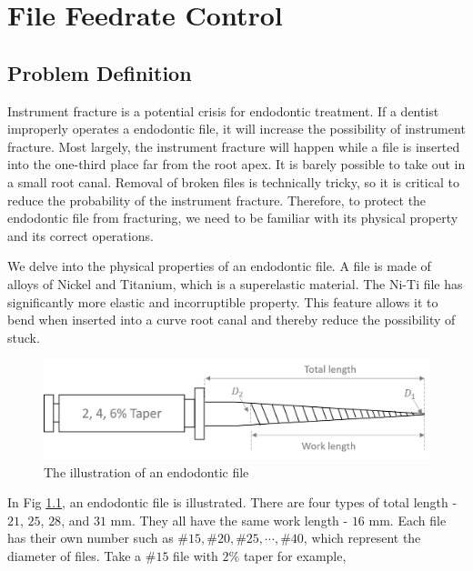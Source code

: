\chapter{File Feedrate Control}
\section{Problem Definition}
\hspace*{6mm}Instrument fracture is a potential crisis for endodontic treatment. If a dentist improperly operates a endodontic file, it will increase the possibility of instrument fracture. Most largely, the instrument fracture will happen while a file is inserted into the one-third place far from the root apex. It is barely possible to take out in a small root canal. Removal of broken files is technically tricky, so it is critical to reduce the probability of the instrument fracture. Therefore, to protect the endodontic file from fracturing, we need to be familiar with its physical property and its correct operations. 
\par
We delve into the physical properties of an endodontic file. A file is made of alloys of Nickel and Titanium, which is a superelastic material. The Ni-Ti file has significantly more elastic and incorruptible property. This feature allows it to bend when inserted into a curve root canal and thereby reduce the possibility of stuck.
\begin{figure}[htbp]
\begin{center}
\includegraphics[width=1\linewidth]{Images/Endodontic_File.png}
\caption{The illustration of an endodontic file
}\label{fig: Endodontic File}
\end{center}
\end{figure}	
\par
In Fig \ref{fig: Endodontic File}, an endodontic file is illustrated. There are four types of total length - $21$, $25$, $28$, and $31$ mm. They all have the same work length - $16$ mm. Each file has their own number such as $\#15, \#20, \#25, \cdots, \#40$, which represent the diameter of files. Take a $\#15$ file with $2\%$ taper for example,
\par\noindent

